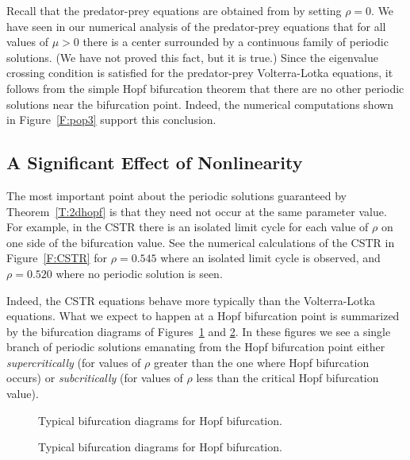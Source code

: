 Recall that the predator-prey equations are obtained from 
by setting $\rho=0$.  We have seen in our numerical analysis of the 
predator-prey equations that for all values of $\mu>0$ there is a center 
surrounded by a continuous family of periodic solutions.  (We 
have not proved this fact, but it is true.)  Since the eigenvalue 
crossing condition is satisfied for the predator-prey Volterra-Lotka 
equations, it follows from the simple Hopf bifurcation theorem that 
there are no other periodic solutions near the bifurcation point. 
  Indeed, the numerical computations 
shown in Figure~\ref{F:pop3} support this conclusion.

\subsection*{A Significant Effect of Nonlinearity}

The most important point about the periodic solutions guaranteed by 
Theorem~\ref{T:2dhopf} is that they need not occur at the same parameter 
value. For example, in the CSTR there is an isolated limit cycle for each 
value of $\rho$ on one side of the bifurcation value.  See the numerical 
calculations of the CSTR in Figure~\ref{F:CSTR} for $\rho=0.545$ where an
isolated limit cycle is observed, and $\rho=0.520$ where no periodic
solution is seen. 

Indeed, the CSTR equations behave more typically than the 
Volterra-Lotka equations.  What we expect to happen at a Hopf bifurcation 
point is summarized by the bifurcation diagrams of Figures~\ref{F:hopf} and 
\ref{F:hopf2}.  In these figures we see a single branch of periodic solutions 
emanating from the Hopf bifurcation point either 
{\em supercritically\/} (for 
values of $\rho$ greater than the one where Hopf bifurcation occurs) or 
{\em subcritically\/} 
(for values of $\rho$ less than the critical Hopf bifurcation value).

\begin{figure}[htb]
           \centerline{%
	   }
           \caption{Typical bifurcation diagrams for Hopf bifurcation.}
           \label{F:hopf}
\end{figure}

\begin{figure}[htb]
           \centerline{%
	   }
           \caption{Typical bifurcation diagrams for Hopf bifurcation.}
           \label{F:hopf2}
\end{figure}

